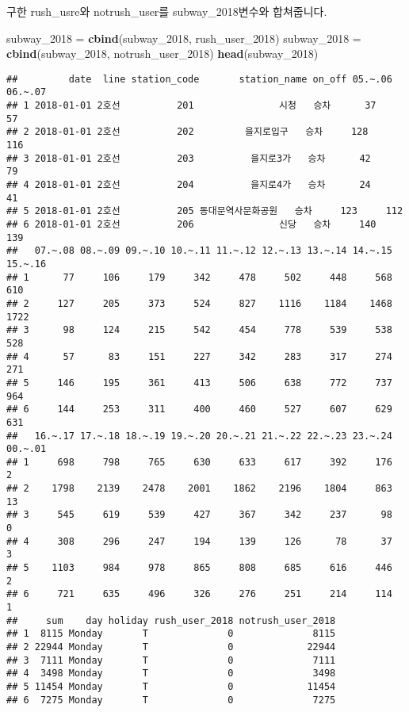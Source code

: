 \documentclass[]{article}
\newenvironment{Shaded}{\begin{snugshade}}{\end{snugshade}}
\newcommand{\KeywordTok}[1]{\textcolor[rgb]{0.13,0.29,0.53}{\textbf{#1}}}
\newcommand{\DecValTok}[1]{\textcolor[rgb]{0.00,0.00,0.81}{#1}}
\newcommand{\StringTok}[1]{\textcolor[rgb]{0.31,0.60,0.02}{#1}}
\newcommand{\NormalTok}[1]{#1}
\begin{document}
구한 rush\_usre와 notrush\_user를 subway\_2018변수와 합쳐줍니다.

\begin{Shaded}
\begin{Highlighting}[]
\NormalTok{subway_}\DecValTok{2018}\NormalTok{ =}\StringTok{ }\KeywordTok{cbind}\NormalTok{(subway_}\DecValTok{2018}\NormalTok{, rush_user_}\DecValTok{2018}\NormalTok{)}
\NormalTok{subway_}\DecValTok{2018}\NormalTok{ =}\StringTok{ }\KeywordTok{cbind}\NormalTok{(subway_}\DecValTok{2018}\NormalTok{, notrush_user_}\DecValTok{2018}\NormalTok{)}
\KeywordTok{head}\NormalTok{(subway_}\DecValTok{2018}\NormalTok{)}
\end{Highlighting}
\end{Shaded}

\begin{verbatim}
##         date  line station_code       station_name on_off 05.~.06 06.~.07
## 1 2018-01-01 2호선          201               시청   승차      37      57
## 2 2018-01-01 2호선          202         을지로입구   승차     128     116
## 3 2018-01-01 2호선          203          을지로3가   승차      42      79
## 4 2018-01-01 2호선          204          을지로4가   승차      24      41
## 5 2018-01-01 2호선          205 동대문역사문화공원   승차     123     112
## 6 2018-01-01 2호선          206               신당   승차     140     139
##   07.~.08 08.~.09 09.~.10 10.~.11 11.~.12 12.~.13 13.~.14 14.~.15 15.~.16
## 1      77     106     179     342     478     502     448     568     610
## 2     127     205     373     524     827    1116    1184    1468    1722
## 3      98     124     215     542     454     778     539     538     528
## 4      57      83     151     227     342     283     317     274     271
## 5     146     195     361     413     506     638     772     737     964
## 6     144     253     311     400     460     527     607     629     631
##   16.~.17 17.~.18 18.~.19 19.~.20 20.~.21 21.~.22 22.~.23 23.~.24 00.~.01
## 1     698     798     765     630     633     617     392     176       2
## 2    1798    2139    2478    2001    1862    2196    1804     863      13
## 3     545     619     539     427     367     342     237      98       0
## 4     308     296     247     194     139     126      78      37       3
## 5    1103     984     978     865     808     685     616     446       2
## 6     721     635     496     326     276     251     214     114       1
##     sum    day holiday rush_user_2018 notrush_user_2018
## 1  8115 Monday       T              0              8115
## 2 22944 Monday       T              0             22944
## 3  7111 Monday       T              0              7111
## 4  3498 Monday       T              0              3498
## 5 11454 Monday       T              0             11454
## 6  7275 Monday       T              0              7275
\end{verbatim}
\end{document}
